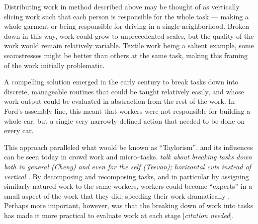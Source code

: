 \documentclass{sigchi}
\begin{document}
Distributing work in method described above may be thought of as vertically slicing work such that 
each person is responsible for the whole task
--- making a whole garment or being responsible for driving in a single neighborhood.
Broken down in this way, work could grow to unprecedented scales,
but the quality of the work would remain relatively variable.
Textile work being a salient example,
some seamstresses might be better than others at the same task,
making this framing of the work initially problematic.

A compelling solution emerged in the early  century to break tasks down into discrete,
manageable routines that could be taught relatively easily,
and whose work output could be evaluated in abstraction from the rest of the work.
In Ford's assembly line, this meant that workers were not responsible for building a whole car,
but a single very narrowly defined action that needed to be done on every car.

This approach paralleled what would be known as ``Taylorism'',
and its influences can be seen today in crowd work and micro--tasks.
\textit{talk about breaking tasks down both in general (Cheng) and even for the self (Teevan);
horizontal cuts instead of vertical}
\cite{cheng2015break,writingMicroTasks}.
By decomposing and recomposing tasks,
and in particular by assigning similarly natured work to the same workers,
workers could become ``experts'' in a small aspect of the work that they did,
speeding their work dramatically
\cite{delayAndOrderLasecki}.
Perhaps more important, however, was that
the breaking down of work into tasks has made it more practical to evaluate work at each stage
[\textit{citation needed}].

\end{document}
